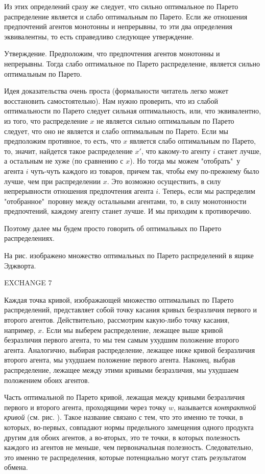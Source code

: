 Из этих определений сразу же следует, что сильно оптимальное по Парето
распределение является и слабо оптимальным по Парето. Если же отношения
предпочтений агентов монотонны и непрерывны, то эти два определения
эквивалентны, то есть справедливо следующее утверждение.

Утверждение. Предположим, что предпочтения агентов монотонны и непрерывны.
Тогда  слабо оптимальное по Парето распределение, является сильно
оптимальным по Парето.

Идея доказательства очень проста (формальности читатель легко
может восстановить самостоятельно). Нам нужно проверить, что из
слабой оптимальности по Парето следует сильная оптимальность, или,
что эквивалентно, из того, что распределение $x$ не является
сильно оптимальным по Парето следует, что оно не является и слабо
оптимальным по Парето. Если мы предположим противное, то есть, что
$x$ является слабо оптимальным по Парето, то, значит, найдется
такое распределение $x'$, что какому-то агенту $i$ станет лучше, а
остальным не хуже (по сравнению с $x$). Но тогда мы можем
"отобрать"\, у агента $i$ чуть-чуть каждого из товаров, причем
так, чтобы ему по-прежнему было лучше, чем при распределении $x$.
Это возможно осуществить, в силу непрерывности отношения
предпочтения агента $i$. Теперь, если мы распределим
"отобранное"\, поровну между остальными агентами, то, в силу
монотонности предпочтений, каждому агенту станет лучше. И мы
приходим к противоречию.


Поэтому далее мы будем просто говорить об оптимальных по Парето
распределениях.

На рис.    изображено множество оптимальных по Парето распределений в ящике Эджворта.


EXCHANGE 7

Каждая точка кривой, изображающей множество оптимальных по Парето
распределений, представляет собой точку касания кривых безразличия
первого и второго агентов. Действительно, рассмотрим какую-либо
точку касания, например, $x$. Если мы выберем распределение,
лежащее выше кривой безразличия первого агента, то мы тем самым
ухудшим положение второго агента. Аналогично, выбирая
распределение, лежащее ниже кривой безразличия второго агента, мы
ухудшаем положение первого агента. Наконец, выбрав распределение,
лежащее между этими кривыми безразличия, мы ухудшаем положением
обоих агентов.

Часть оптимальной по Парето кривой, лежащая между кривыми
безразличия первого и второго агента, проходящими через точку $w$,
называется \emph{контрактной
кривой} (см. рис.    ). Такое название связано с тем, что это именно те
точки, в которых, во-первых, совпадают нормы предельного замещения
одного продукта другим для обоих агентов, а во-вторых, это те
точки, в которых полезность каждого из агентов не меньше, чем
первоначальная полезность. Следовательно, это именно те
распределения, которые потенциально могут стать результатом
обмена.


